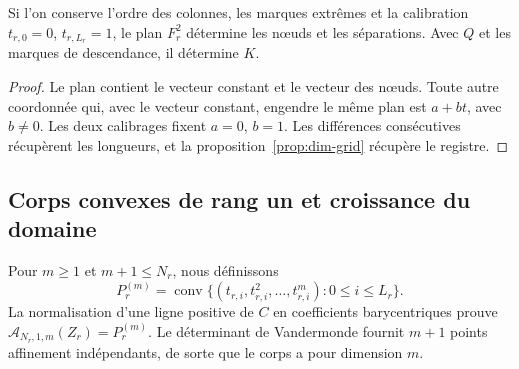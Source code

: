 \begin{proposition}
Si l’on conserve l’ordre des colonnes, les marques extrêmes et la
calibration \(t_{r,0}=0\), \(t_{r,L_r}=1\), le plan \(F_r^2\)
détermine les nœuds et les séparations. Avec \(Q\) et les
marques de descendance, il détermine \(K\).
\end{proposition}
\begin{proof}
Le plan contient le vecteur constant et le vecteur des nœuds. Toute
autre coordonnée qui, avec le vecteur constant, engendre le même
plan est \(a+bt\), avec \(b\neq0\). Les deux calibrages fixent
\(a=0\), \(b=1\). Les différences consécutives récupèrent les
longueurs, et la proposition~\ref{prop:dim-grid} récupère le registre.
\end{proof}

\subsection{Corps convexes de rang un et croissance du domaine}

Pour \(m\geq1\) et \(m+1\leq N_r\), nous définissons
\[
 P_r^{(m)}=\operatorname{conv}
 \{(t_{r,i},t_{r,i}^2,\ldots,t_{r,i}^m):0\leq i\leq L_r\}.
\]
La normalisation d'une ligne positive de \(C\) en coefficients barycentriques prouve \(\mathcal A_{N_r,1,m}(Z_r)=P_r^{(m)}\). Le déterminant de Vandermonde fournit \(m+1\) points affinement indépendants, de sorte que le corps a pour dimension \(m\).

